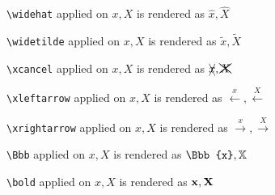 \texttt{\textbackslash widehat} applied on $x,X$ is rendered as $\widehat{x},\widehat{X}$


\texttt{\textbackslash widetilde} applied on $x,X$ is rendered as $\widetilde{x},\widetilde{X}$


\texttt{\textbackslash xcancel} applied on $x,X$ is rendered as $\xcancel{x},\xcancel{X}$


\texttt{\textbackslash xleftarrow} applied on $x,X$ is rendered as $\xleftarrow{x},\xleftarrow{X}$


\texttt{\textbackslash xrightarrow} applied on $x,X$ is rendered as $\xrightarrow{x},\xrightarrow{X}$


\texttt{\textbackslash Bbb} applied on $x,X$ is rendered as $\Bbb{x},\Bbb{X}$


\texttt{\textbackslash bold} applied on $x,X$ is rendered as $\bold{x},\bold{X}$

